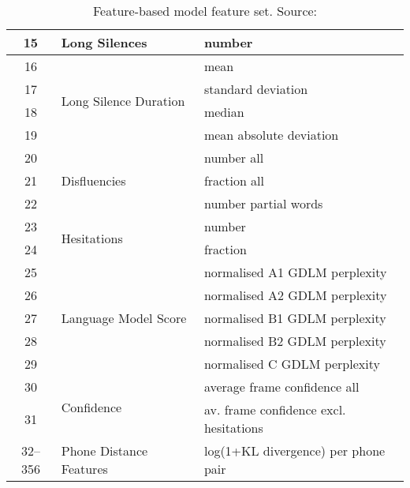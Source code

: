 \begin{table}[H]
\begin{tabular}{|c|l|l|}
        \hline
        15           & Long Silences                            & number                                 \\
        \hline
        16           & \multirow{4}{*}{Long Silence Duration}   & mean                                   \\
        17           &                                          & standard deviation                     \\
        18           &                                          & median                                 \\
        19           &                                          & mean absolute deviation                \\
        \hline
        20           & \multirow{3}{*}{Disfluencies}            & number all                             \\
        21           &                                          & fraction all                           \\
        22           &                                          & number partial words                   \\
        \hline
        23           & \multirow{2}{*}{Hesitations}             & number                                 \\
        24           &                                          & fraction                               \\
        \hline
        25           & \multirow{5}{*}{Language Model Score}    & normalised A1 GDLM perplexity          \\
        26           &                                          & normalised A2 GDLM perplexity          \\
        27           &                                          & normalised B1 GDLM perplexity          \\
        28           &                                          & normalised B2 GDLM perplexity          \\
        29           &                                          & normalised C GDLM perplexity           \\
        \hline
        30           & \multirow{2}{*}{Confidence}              & average frame confidence all           \\
        31           &                                          & av. frame confidence excl. hesitations \\
        \hline
        32--356      & Phone Distance Features                  & log(1+KL divergence) per phone pair    \\
        \hline
    \end{tabular}
    \caption{Feature-based model feature set. Source: \cite{feature}}
    \label{tab:feature_full}
\end{table}

